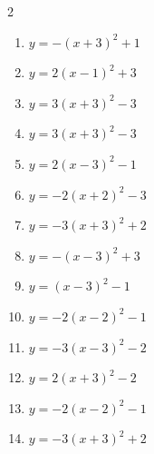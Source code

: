 \documentclass[b5paper,10pt]{ltjsarticle}
\begin{document}
\begin{multicols}{ 2 }
\begin{enumerate}
\vspace{170pt}\item $\displaystyle{} y= -\left( x+3\right)^{2}+1$

\vspace{170pt}\item $\displaystyle{} y= 2\left( x-1\right)^{2}+3$

\vspace{170pt}\item $\displaystyle{} y= 3\left( x+3\right)^{2}-3$

\vspace{170pt}\item $\displaystyle{} y= 3\left( x+3\right)^{2}-3$

\vspace{170pt}\item $\displaystyle{} y= 2\left( x-3\right)^{2}-1$

\vspace{170pt}\item $\displaystyle{} y= -2\left( x+2\right)^{2}-3$

\vspace{170pt}\item $\displaystyle{} y= -3\left( x+3\right)^{2}+2$

\vspace{170pt}\item $\displaystyle{} y= -\left( x-3\right)^{2}+3$

\vspace{170pt}\item $\displaystyle{} y= \left( x-3\right)^{2}-1$

\vspace{170pt}\item $\displaystyle{} y= -2\left( x-2\right)^{2}-1$

\vspace{170pt}\item $\displaystyle{} y= -3\left( x-3\right)^{2}-2$

\vspace{170pt}\item $\displaystyle{} y= 2\left( x+3\right)^{2}-2$

\vspace{170pt}\item $\displaystyle{} y= -2\left( x-2\right)^{2}-1$

\vspace{170pt}\item $\displaystyle{} y= -3\left( x+3\right)^{2}+2$


\end{enumerate}
\end{multicols}
\end{document}
